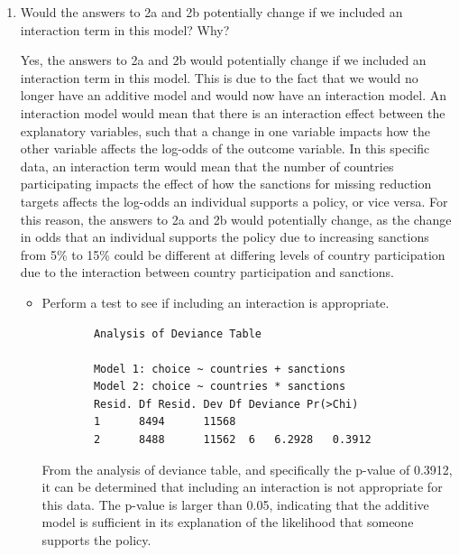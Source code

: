 \documentclass[12pt,letterpaper]{article}
\begin{document}
\begin{enumerate}
\begin{enumerate}
	\end{enumerate}
	\item
	Would the answers to 2a and 2b potentially change if we included an interaction term in this model? Why? 
	
	\noindent Yes, the answers to 2a and 2b would potentially change if we included an interaction term in this model. This is due to the fact that we would no longer have an additive model and would now have an interaction model. An interaction model would mean that there is an interaction effect between the explanatory variables, such that a change in one variable impacts how the other variable affects the log-odds of the outcome variable. In this specific data, an interaction term would mean that the number of countries participating impacts the effect of how the sanctions for missing reduction targets affects the log-odds an individual supports a policy, or vice versa. For this reason, the answers to 2a and 2b would potentially change, as the change in odds that an individual supports the policy due to increasing sanctions from 5\% to 15\% could be different at differing levels of country participation due to the interaction between country participation and sanctions.
	
	\begin{itemize}
		\item Perform a test to see if including an interaction is appropriate.
		
		\noindent 
		
		
			
		
		
	\begin{verbatim}
		Analysis of Deviance Table
		
		Model 1: choice ~ countries + sanctions
		Model 2: choice ~ countries * sanctions
		Resid. Df Resid. Dev Df Deviance Pr(>Chi)
		1      8494      11568                     
		2      8488      11562  6   6.2928   0.3912
	\end{verbatim}
		
		\noindent From the analysis of deviance table, and specifically the p-value of 0.3912, it can be determined that including an interaction is not appropriate for this data. The p-value is larger than 0.05, indicating that the additive model is sufficient in its explanation of the likelihood that someone supports the policy. 
		
	\end{itemize}
	\end{enumerate}
\end{document}
